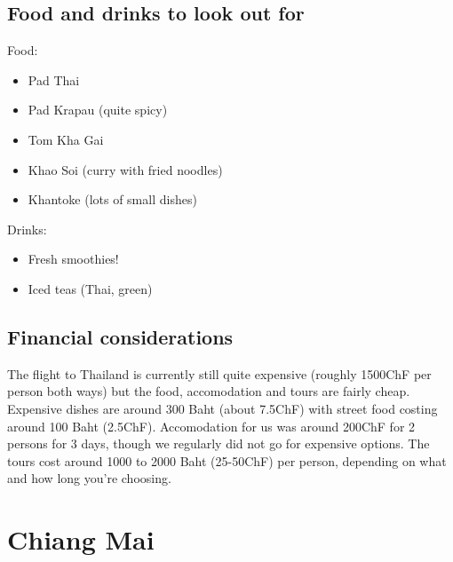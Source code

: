 \documentclass[11pt,a4paper,sans,english]{article}
\begin{document}
\subsection{Food and drinks to look out for}
Food:
\begin{itemize}
	\itemsep-0.5em 
	\item Pad Thai
	\item Pad Krapau (quite spicy)
	\item Tom Kha Gai
	\item Khao Soi (curry with fried noodles)
	\item Khantoke (lots of small dishes)
\end{itemize}
Drinks:
\begin{itemize}
	\itemsep-0.5em 
	\item Fresh smoothies!
	\item Iced teas (Thai, green)
\end{itemize}
\subsection{Financial considerations}
The flight to Thailand is currently still quite expensive (roughly 1500ChF per person both ways) but the food, accomodation and tours are fairly cheap. Expensive dishes are around 300 Baht (about 7.5ChF) with street food costing around 100 Baht (2.5ChF). Accomodation for us was around 200ChF for 2 persons for 3 days, though we regularly did not go for expensive options. The tours cost around 1000 to 2000 Baht (25-50ChF) per person, depending on what and how long you're choosing. 
\section{Chiang Mai}
\end{document}
